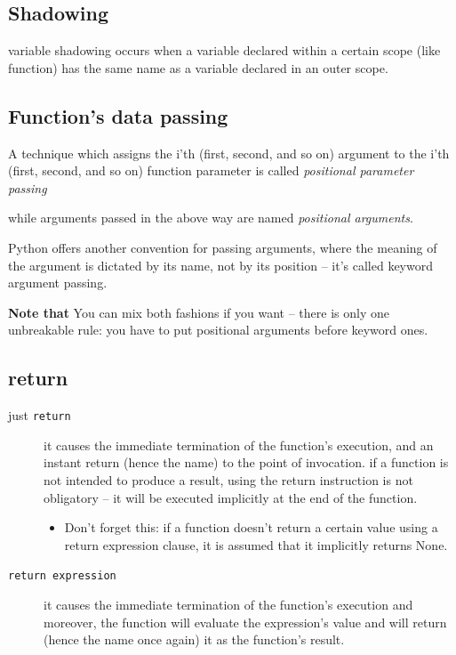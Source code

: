 \documentclass[11pt]{article}
\begin{document}
\subsection{Shadowing}
\label{sec:org067ee5d}
variable shadowing occurs when a variable declared within a certain
scope (like function) has the same name as a
variable declared in an outer scope.
\subsection{Function's data passing}
\label{sec:org680c34c}
\begin{description}
\item[{Positional parameter passing}] A technique which assigns the i'th (first, second, and so on)
argument to the i'th (first, second, and so on) function
parameter is called \emph{positional parameter passing}
\item[{Positional arguments}] while arguments passed in the above way are named \emph{positional arguments}.
\item[{keyword argument passing}] Python offers another convention for passing arguments, where
the meaning of the argument is dictated by its name, not by its
position – it’s called keyword argument passing.

\item \textbf{Note that} You can mix both fashions if you want – there is only
one unbreakable rule: you have to put positional arguments before
keyword ones.
\end{description}
\subsection{return}
\label{sec:org701453e}
\begin{description}
\item[{just \texttt{return}}] it causes the immediate termination of the function’s execution,
and an instant return (hence the name) to the
point of invocation. if a function is not intended
to produce a result, using the return instruction
is not obligatory – it will be executed implicitly
at the end of the function.
\begin{itemize}
\item Don’t forget this: if a function doesn’t return a certain
value using a return expression clause, it is assumed that
it implicitly returns None.
\end{itemize}
\item[{\texttt{return expression}}] it causes the immediate termination of the function’s execution
and moreover, the function will evaluate the expression’s value
and will return (hence the name once again) it as the function’s
result.
\end{description}
\end{document}

